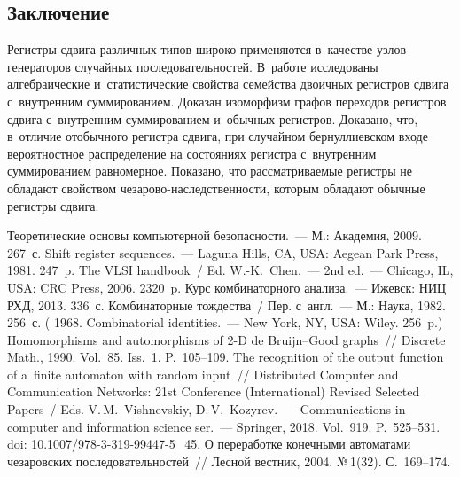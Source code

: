 \begin{multicols}{2}
\section{Заключение}

  Регистры сдвига различных типов широко применяются в~качестве узлов 
генераторов случайных последовательностей. В~работе исследованы 
алгебраические и~статистические свойства семейства двоичных регистров 
сдвига с~внутренним суммированием. Доказан изоморфизм графов переходов 
регистров сдвига с~внутренним суммированием и~обычных регистров. 
Доказано, что, в~отличие от\linebreak обычного регистра сдвига, при случайном 
бернуллиевском входе вероятностное распределение на состояниях регистра 
с~внутренним суммированием равномерное. Показано, что рассматриваемые 
регистры не обладают свойством че\-за\-ро\-во-на\-след\-ст\-вен\-ности, которым 
обладают обычные регистры сдвига. 
  
{\small\frenchspacing
 {%
 \begin{thebibliography}{9}
  
 Теоретические основы компьютерной 
безопасности.~--- М.: 
Академия, 2009. 267~с.
 Shift register sequences.~--- Laguna Hills, CA, USA: Aegean Park Press, 
1981. 247~p.
The VLSI handbook~/ Ed. W.-K.~Chen.~--- 2nd ed.~--- Chicago, IL, USA: CRC Press, 2006. 2320~p. 
 Курс комбинаторного анализа.~--- Ижевск: НИЦ РХД, 2013. 336~с. 
 Комбинаторные тождества~/ Пер. с~англ.~--- М.: Наука, 1982. 256~с. 
( 1968. Combinatorial identities.~--- New York, NY, USA: Wiley. 256~p.)
 Homomorphisms and automorphisms of 2-D de Bruijn--Good graphs~// Discrete 
Math., 1990. Vol.~85. Iss.~1. P.~105--109. 
 The recognition of the output function of a~finite 
automaton with random input~// Distributed Computer and Communication Networks: 
21st Conference (International) Revised Selected Papers~/ Eds. 
V.\,M.~Vishnevskiy, D.\,V.~Kozyrev.~--- Communications in computer and information 
science ser.~--- Springer, 2018. Vol.~919. P.~525--531. doi: 10.1007/978-3-319-99447-5\_45.
 О переработке конечными автоматами чезаровских 
последовательностей~// Лесной вестник, 2004. №\,1(32). 
С.~169--174.
\end{thebibliography}

 }
 }

\end{multicols}

